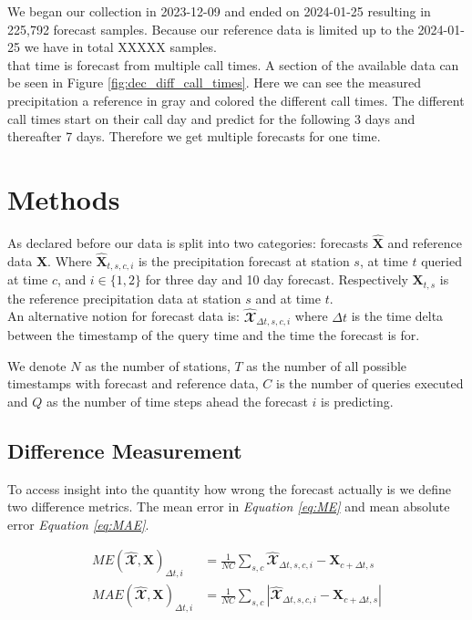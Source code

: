 \documentclass{article}
\theoremstyle{plain}
\theoremstyle{definition}
\theoremstyle{remark}
\begin{document}
We began our collection in 2023-12-09 and ended on 2024-01-25 resulting in
225,792 forecast samples. Because our reference data is limited up to the
2024-01-25 we have in total XXXXX samples. \\
that time is forecast from multiple call times.
A section of the available data can be seen in Figure
\ref{fig:dec_diff_call_times}. Here we can see the measured precipitation a
reference in gray and colored the different call times. The different call
times start on their call day and predict for the following 3 days and
thereafter 7 days. Therefore we get multiple forecasts for one time.

\section{Methods}\label{sec:Methods}
As declared before our data is split into two categories: forecasts
$\hat{\textbf{X}}$ and reference data $\textbf{X}$. Where $\hat{\textbf{X}}_{t,
        s, c, i}$ is the precipitation forecast at station $s$, at time $t$ queried at
time $c$, and $i \in \{1, 2\}$ for three day and 10 day forecast. Respectively
$\textbf{X}_{t, s}$ is the reference precipitation data at station $s$ and at
time $t$.\\
An alternative notion for forecast data is: $\hat{\mathbfcal{X}}_{\Delta t, s,
        c, i}$ where $\Delta t$ is the time delta between the timestamp of the query
time and the time the forecast is for.

We denote $N$ as the number of stations, $T$ as the number of all possible
timestamps with forecast and reference data, $C$ is the number of queries
executed and $Q$ as the number of time steps ahead the forecast $i$ is
predicting.

\subsection{Difference Measurement}\label{sec:mean}
To access insight into the quantity how wrong the forecast actually is we
define two difference metrics. The mean error in \textit{Equation \ref{eq:ME}}
and mean absolute error \textit{Equation \ref{eq:MAE}}.

\begin{align}
    ME(\hat{\mathbfcal{X}}, \textbf{X})_{\Delta t, i}  & =   \frac{1}{N C}
    \sum_{s, c} \hat{\mathbfcal{X}}_{\Delta t, s, c, i} - \textbf{X}_{c + \Delta t,
        s}
    \label{eq:ME}                                                          \\
    MAE(\hat{\mathbfcal{X}}, \textbf{X})_{\Delta t, i} & =   \frac{1}{N C}
    \sum_{s, c} |\hat{\mathbfcal{X}}_{\Delta t, s, c, i} - \textbf{X}_{c + \Delta
        t, s}|
    \label{eq:MAE}
\end{align}
\end{document}
